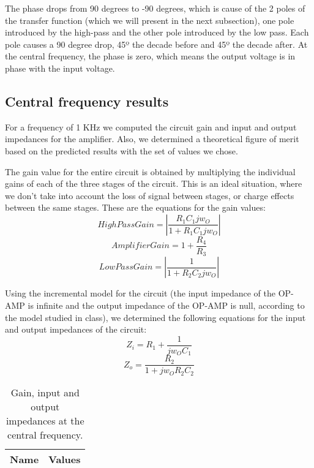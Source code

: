 The phase drops from 90 degrees to -90 degrees, which is cause of the 2 poles of the transfer function (which we will present in the next subsection), one pole introduced by the high-pass and the other pole introduced by the low pass. Each pole causes a 90 degree drop, 45º the decade before and 45º the decade after. At the central frequency, the phase is zero, which means the output voltage is in phase with the input voltage.

\subsection{Central frequency results}
For a frequency of 1 KHz we computed the circuit gain and input and output impedances for the amplifier. Also, we determined a theoretical figure of merit based on the predicted results with the set of values we chose.

The gain value for the entire circuit is obtained by multiplying the individual gains of each of the three stages of the circuit. This is an ideal situation, where we don't take into account the loss of signal between stages, or charge effects between the same stages.
These are the equations for the gain values:
\begin{equation}
High Pass Gain=|\frac{R_{1}C_{1}jw_{O}}{1+R_{1}C_{1}jw_{O}}|
\end{equation}
\begin{equation}
Amplifier Gain=1+\frac{R_{4}}{R_{3}}
\end{equation}
\begin{equation}
Low Pass Gain=|\frac{1}{1+R_{2}C_{2}jw_{O}}|
\end{equation}

Using the incremental model for the circuit (the input impedance of the OP-AMP is infinite and the output impedance of the OP-AMP is null, according to the model studied in class), we determined the following equations for the input and output impedances of the circuit:
\begin{equation}
Z_i = R_1 + \frac{1}{jw_{O}C_{1}}
\end{equation}
\begin{equation}
Z_o = \frac{R_2}{1+jw_OR_2C_2}
\end{equation}

\begin{table}[h!]
  \centering
  \begin{tabular}{|l|r|}
    \hline    
    {\bf Name} & {\bf Values} \\ \hline
     
  \end{tabular}
  \caption{Gain, input and output impedances at the central frequency.}
  \label{tab:data}
\end{table}

